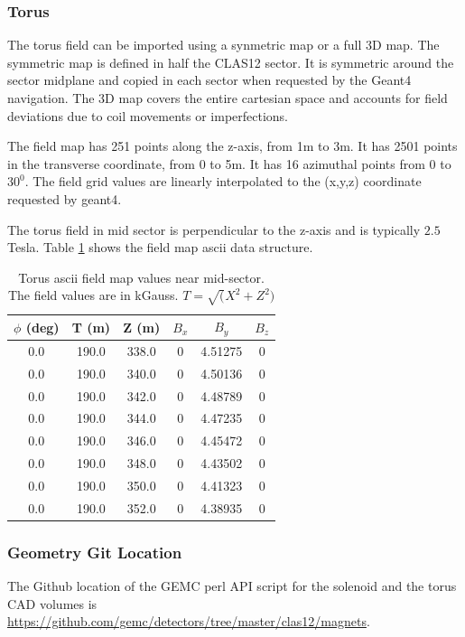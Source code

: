 \subsubsection{Torus}
The torus field can be imported using a synmetric map or a full 3D map.
The symmetric map is defined in half the CLAS12 sector. It is symmetric around the sector midplane and copied in each sector
when requested by the Geant4 navigation. The 3D map covers the entire cartesian space and accounts for field deviations due to coil
movements or imperfections.


The field map has 251 points along the z-axis, from 1m to 3m. It has 2501 points in the transverse coordinate, from 0 to 5m.
It has 16 azimuthal points from $0$ to $30^0$. The field grid values are linearly interpolated to the (x,y,z) coordinate requested by geant4.

The torus field in mid sector is perpendicular to the z-axis and is typically $2.5$ Tesla.
Table \ref{tab:torMap} shows the field map ascii data structure.

\begin{table}[h]
	\begin{center}
		\begin{tabular}{| c | c | c | c | c | c | }
         $\phi$ (deg) & T (m)    & Z (m)    &  $B_x $  &    $B_y$    & $B_z$\\
			\hline
          0.0         &  190.0   &  338.0   &  0       &     4.51275 &  0 \\
          0.0         &  190.0   &  340.0   &  0       &     4.50136 &  0 \\
          0.0         &  190.0   &  342.0   &  0       &     4.48789 &  0 \\
          0.0         &  190.0   &  344.0   &  0       &     4.47235 &  0 \\
          0.0         &  190.0   &  346.0   &  0       &     4.45472 &  0 \\
          0.0         &  190.0   &  348.0   &  0       &     4.43502 &  0 \\
          0.0         &  190.0   &  350.0   &  0       &     4.41323 &  0 \\
          0.0         &  190.0   &  352.0   &  0       &     4.38935 &  0 \\
		\end{tabular}
	\end{center}
	\caption{Torus ascii field map values near mid-sector. The field values are in kGauss. $T=\sqrt(X^2+Z^2)$}\label{tab:torMap}
\end{table}


\subsubsection{Geometry Git Location}
The Github location of the GEMC perl API script for the solenoid and the torus CAD volumes is \url{https://github.com/gemc/detectors/tree/master/clas12/magnets}.

